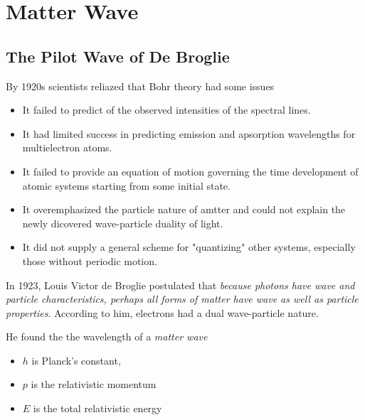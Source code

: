 \chapter{Matter Wave} %
\label{cha:Matter Wave}
    \section{The Pilot Wave of De Broglie}
        By 1920s scientists reliazed that Bohr theory had some issues
        \begin{itemize}
            \item It failed to predict of the observed intensities of the spectral lines.
            \item It had limited success in predicting emission and apsorption wavelengths for multielectron atoms.
            \item It failed to provide an equation of motion governing the time development of atomic systems starting from some initial state.
            \item It overemphasized the particle nature of amtter and could not explain the newly dicovered wave-particle duality of light.
            \item It did not supply a general scheme for "quantizing" other systems, especially those without periodic motion.
        \end{itemize}

        In 1923, Louis Victor de Broglie postulated that \textit{because photons have wave and particle characteristics, perhaps all forms of matter have wave 
        as well as particle properties}. According to him, electrons had a dual wave-particle nature.

        He found the the wavelength of a \textit{matter wave}
        {\tiny \begin{itemize}
            \item $h$ is Planck's constant, 
            \item $p$ is the relativistic momentum
            \item $E$ is the total relativistic energy
        \end{itemize}}


